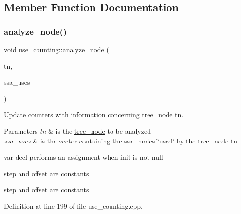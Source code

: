 \subsection{Member Function Documentation}
\mbox{\label{classuse__counting_a7772a13ea271918f8f5d3136d73e05d7}} 
\subsubsection{\texorpdfstring{analyze\+\_\+node()}{analyze\_node()}}
{\footnotesize\ttfamily void use\+\_\+counting\+::analyze\+\_\+node (\begin{DoxyParamCaption}\item[{\hyperlink{tree__node_8hpp_a6ee377554d1c4871ad66a337eaa67fd5}{tree\+\_\+node\+Ref} \&}]{tn,  }\item[{\hyperlink{classCustomOrderedSet}{Custom\+Ordered\+Set}$<$ \hyperlink{tree__node_8hpp_a6ee377554d1c4871ad66a337eaa67fd5}{tree\+\_\+node\+Ref} $>$ \&}]{ssa\+\_\+uses }\end{DoxyParamCaption})\hspace{0.3cm}{\ttfamily [private]}}



Update counters with information concerning \hyperlink{classtree__node}{tree\+\_\+node} tn. 


\begin{DoxyParams}{Parameters}
{\em tn} & is the \hyperlink{classtree__node}{tree\+\_\+node} to be analyzed \\
\hline
{\em ssa\+\_\+uses} & is the vector containing the ssa\+\_\+nodes \char`\"{}used\char`\"{} by the \hyperlink{classtree__node}{tree\+\_\+node} tn \\
\hline
\end{DoxyParams}
var decl performs an assignment when init is not null

step and offset are constants

step and offset are constants 

Definition at line 199 of file use\+\_\+counting.\+cpp.



